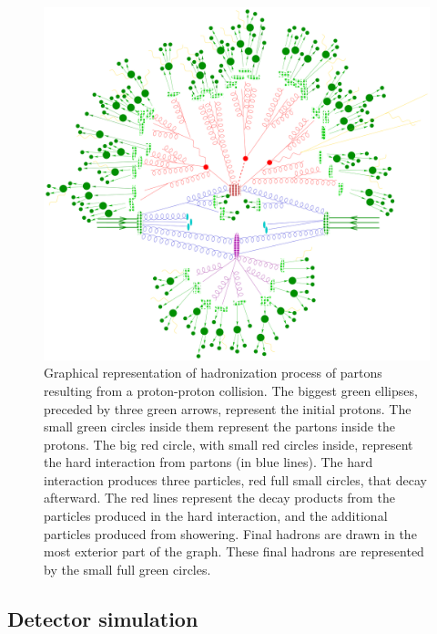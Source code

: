 \begin{figure}[!Hhtbp]
  \begin{center}
    \includegraphics[width=\textwidth]{figs/parton_shower.png}
    \caption{Graphical representation of hadronization process of partons resulting from a proton-proton collision. The biggest green ellipses, preceded by three green arrows, represent the initial protons. The small green circles inside them represent the partons inside the protons. The big red circle, with small red circles inside, represent the hard interaction from partons (in blue lines). The hard interaction produces three particles, red full small circles, that decay afterward. The red lines represent the decay products from the particles produced in the hard interaction, and the additional particles produced from showering. Final hadrons are drawn in the most exterior part of the graph. These final hadrons are represented by the small full green circles.}
    \label{fig:Hadr}
  \end{center}
\end{figure}

\subsection{Detector simulation}
\label{sec:detector}

